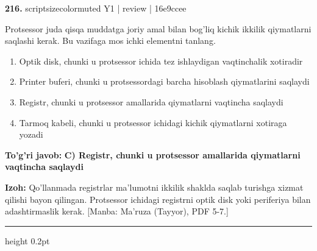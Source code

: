 \documentclass[10pt,a4paper]{article}
\begin{document}
{\bfseries\sffamily\color{ink} 216.} {scriptsizecolor{muted} Y1 | review | 16e9ccee}
\par
Protsessor juda qisqa muddatga joriy amal bilan bog'liq kichik ikkilik qiymatlarni saqlashi kerak. Bu vazifaga mos ichki elementni tanlang.
\begin{enumerate}[label=\Alph*),leftmargin=9mm]
\item Optik disk, chunki u protsessor ichida tez ishlaydigan vaqtinchalik xotiradir
\item Printer buferi, chunki u protsessordagi barcha hisoblash qiymatlarini saqlaydi
\item Registr, chunki u protsessor amallarida qiymatlarni vaqtincha saqlaydi
\item Tarmoq kabeli, chunki u protsessor ichidagi kichik qiymatlarni xotiraga yozadi
\end{enumerate}
\begin{tcolorbox}[enhanced,breakable,colback=teal!4,colframe=teal!60!black,boxrule=0.45pt,arc=1.2mm,left=2.7mm,right=2.7mm,top=1.8mm,bottom=1.8mm,before skip=2mm,after skip=2mm]
{\bfseries\sffamily\color{teal}To'g'ri javob:} \textbf{C) Registr, chunki u protsessor amallarida qiymatlarni vaqtincha saqlaydi}
\par\smallskip
{\bfseries Izoh:} Qo'llanmada registrlar ma'lumotni ikkilik shaklda saqlab turishga xizmat qilishi bayon qilingan. Protsessor ichidagi registrni optik disk yoki periferiya bilan adashtirmaslik kerak. [Manba: Ma'ruza (Tayyor), PDF 5-7.]
\end{tcolorbox}
\vspace{2mm}\hrule height 0.2pt\vspace{3mm}
\end{document}
